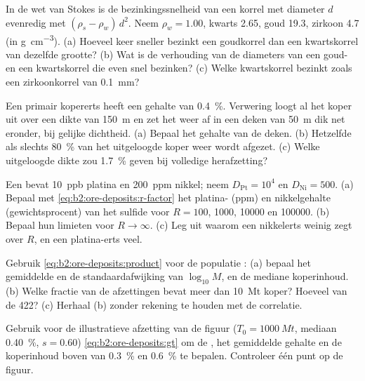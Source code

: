 \begin{exercise}[$\star$]\label{exo:b2:ore-deposits:3}
In de wet van Stokes is de bezinkingssnelheid van een korrel met diameter $d$ evenredig met $(\rho_s -
\rho_w)\,d^2$. Neem $\rho_w = 1.00$, kwarts 2.65, goud 19.3, zirkoon 4.7 (in
\unit{g.cm^{-3}}). (a) Hoeveel keer sneller bezinkt een goudkorrel dan een kwartskorrel van
dezelfde grootte? (b) Wat is de verhouding van de diameters van een goud- en een kwartskorrel die even
snel bezinken? (c) Welke kwartskorrel bezinkt zoals een zirkoonkorrel van \qty{0.1}{mm}?
\end{exercise}

\begin{exercise}[$\star$]\label{exo:b2:ore-deposits:4}
Een primair kopererts heeft een gehalte van \qty{0.4}{\percent}. Verwering loogt al het koper uit over een
dikte van \qty{150}{m} en zet het weer af in een deken van \qty{50}{m} dik net eronder, bij gelijke
dichtheid. (a) Bepaal het gehalte van de deken. (b) Hetzelfde als slechts \qty{80}{\percent} van het
uitgeloogde koper weer wordt afgezet. (c) Welke uitgeloogde dikte zou \qty{1.7}{\percent} geven bij
volledige herafzetting?
\end{exercise}

\begin{exercise}[$\star\star$]\label{exo:b2:ore-deposits:5}
Een  bevat \qty{10}{ppb} platina en \qty{200}{ppm} nikkel; neem $D_{\mathrm{Pt}} =
10^4$ en $D_{\mathrm{Ni}} = 500$. (a) Bepaal met \eqref{eq:b2:ore-deposits:r-factor} het
platina- (ppm) en nikkelgehalte (gewichtsprocent) van het sulfide voor $R = 100$, \num{1000}, \num{10000}
en \num{100000}. (b) Bepaal hun limieten voor $R \to \infty$. (c) Leg uit waarom een nikkelerts
weinig zegt over $R$, en een platina-erts veel.
\end{exercise}

\begin{exercise}[$\star\star$]\label{exo:b2:ore-deposits:6}
Gebruik \eqref{eq:b2:ore-deposits:product} voor de populatie : (a) bepaal het gemiddelde en de
standaardafwijking van $\log_{10} M$, en de mediane koperinhoud. (b) Welke fractie van de afzettingen
bevat meer dan \qty{10}{Mt} koper? Hoeveel van de 422? (c) Herhaal (b) zonder rekening te houden met de correlatie.
\end{exercise}

\begin{exercise}[$\star\star$]\label{exo:b2:ore-deposits:7}
Gebruik voor de illustratieve afzetting van de figuur ($T_0 = \qty{1000}{Mt}$, mediaan \qty{0.40}{\percent},
$s = 0.60$) \eqref{eq:b2:ore-deposits:gt} om de , het gemiddelde gehalte en de koperinhoud
boven  van \qty{0.3}{\percent} en \qty{0.6}{\percent} te bepalen. Controleer één punt op de figuur.
\end{exercise}

